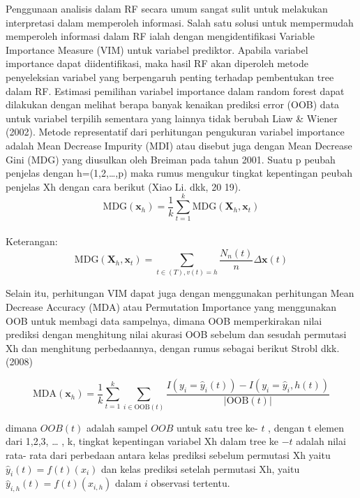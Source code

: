Penggunaan analisis dalam RF secara umum sangat sulit untuk melakukan interpretasi dalam memperoleh informasi. Salah satu solusi untuk mempermudah memperoleh informasi dalam RF ialah dengan mengidentifikasi Variable Importance Measure (VIM) untuk variabel prediktor. Apabila variabel importance dapat diidentifikasi, maka hasil RF akan diperoleh metode penyeleksian variabel yang berpengaruh penting terhadap pembentukan tree dalam RF. Estimasi pemilihan variabel importance dalam random forest dapat dilakukan dengan melihat berapa banyak kenaikan prediksi error (OOB) data untuk variabel terpilih sementara yang lainnya tidak berubah Liaw \& Wiener (2002).
Metode representatif dari perhitungan pengukuran variabel importance adalah Mean Decrease Impurity (MDI) atau disebut juga dengan Mean Decrease Gini (MDG) yang diusulkan oleh Breiman pada tahun 2001. Suatu p peubah penjelas dengan h=(1,2,…,p) maka rumus mengukur tingkat kepentingan peubah penjelas Xh dengan cara berikut (Xiao Li. dkk, 20 19).
\begin{equation}
  \text{MDG}(\mathbf{x}_h) = \frac{1}{k} \sum_{t=1}^{k} \text{MDG}(\mathbf{X}_h, \mathbf{x}_t)
  \end{equation}
\\
Keterangan:
\begin{equation}
  \text{MDG}(\mathbf{X}_h, \mathbf{x}_t) = \sum_{t \in (T), v(t) = h} \frac{N_n(t)}{n} \Delta\mathbf{x}(t)
  \end{equation}

  Selain itu, perhitungan VIM dapat juga dengan menggunakan perhitungan
  Mean Decrease Accuracy (MDA) atau Permutation Importance yang menggunakan
  OOB untuk membagi data sampelnya, dimana OOB memperkirakan nilai prediksi
  dengan menghitung nilai akurasi OOB sebelum dan sesudah permutasi Xh dan
  menghitung perbedaannya, dengan rumus sebagai berikut Strobl dkk. (2008)

  \begin{equation}
    \text{MDA}(\mathbf{x}_h) = \frac{1}{k} \sum_{t=1}^{k} \sum_{i \in \text{OOB}(t)} \frac{I(y_i = \hat{y}_i(t)) - I(y_i = \hat{y}_i, h(t))}{|\text{OOB}(t)|}
    \end{equation}

    dimana $OOB(t)$ adalah sampel $OOB$ untuk satu tree ke- $t$ , dengan t elemen dari 
{1,2,3, … , k}, tingkat kepentingan variabel Xh dalam tree ke $- t$ adalah nilai rata-
rata dari perbedaan antara kelas prediksi sebelum permutasi Xh yaitu $\hat{y}_i(t) = f(t)(x_i)$ dan kelas prediksi setelah permutasi Xh, yaitu $\hat{y}_{i,h}(t) = f(t)(x_{i,h})$
dalam $i$ observasi tertentu.